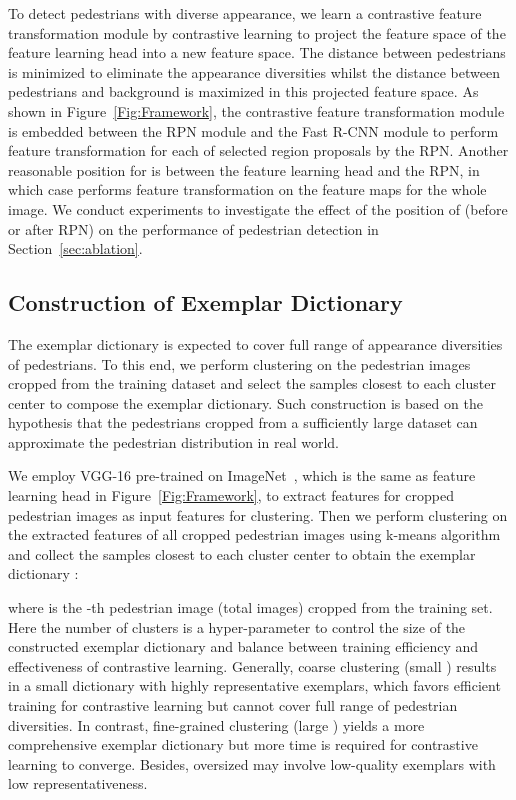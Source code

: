 \documentclass[journal]{IEEEtran}
\begin{document}
To detect pedestrians with diverse appearance, we learn a contrastive feature transformation module  by contrastive learning to project the feature space of the feature learning head  into a new feature space. The distance between pedestrians is minimized to eliminate the appearance diversities whilst the distance between pedestrians and background is maximized in this projected feature space.  As shown in Figure~\ref{Fig:Framework}, the contrastive feature transformation module  is embedded between the RPN module and the Fast R-CNN module to perform feature transformation for each of selected region proposals by the RPN. Another reasonable position for  is between the feature learning head  and the RPN, in which case  performs feature transformation on the feature maps for the whole image. We conduct experiments to investigate the effect of the position of  (before or after RPN) on the performance of pedestrian detection in Section~\ref{sec:ablation}.



\vspace{-8pt}
\subsection{Construction of Exemplar Dictionary}
\label{exemplar construction}
The exemplar dictionary is expected to cover full range of appearance diversities of pedestrians. To this end, we perform clustering on the pedestrian images cropped from the training dataset and select the samples closest to each cluster center to compose the exemplar dictionary. Such construction is based on the hypothesis that the pedestrians cropped from a sufficiently large dataset can approximate the pedestrian distribution in real world. 

We employ VGG-16 pre-trained on ImageNet~\cite{deng2009imagenet}, which is the same as feature learning head  in Figure~\ref{Fig:Framework}, to extract features for cropped pedestrian images as input features for clustering. 
Then we perform clustering on the extracted features of all cropped pedestrian images using k-means algorithm~\cite{macqueen1967some} and collect the samples closest to each cluster center to obtain the exemplar dictionary :

where  is the -th pedestrian image (total  images) cropped from the training set.
Here the number of clusters  is a hyper-parameter to control the size of the constructed exemplar dictionary and balance between training efficiency and effectiveness of contrastive learning. 
Generally, coarse clustering (small ) results in a small dictionary with highly representative exemplars, which favors efficient training for contrastive learning but cannot cover full range of pedestrian diversities. In contrast, fine-grained clustering (large ) yields a more comprehensive exemplar dictionary but more time is required for contrastive learning to converge. Besides, oversized  may involve low-quality exemplars with low representativeness.
\end{document}

